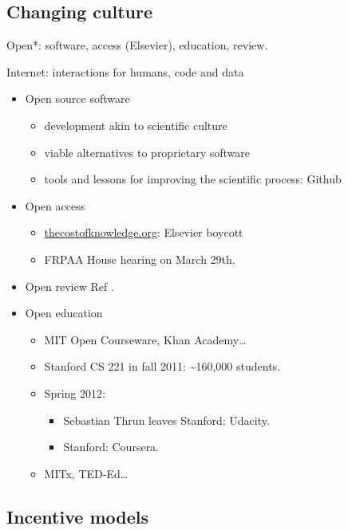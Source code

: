 \documentclass[ChapterTOCs,krantz2]{krantz} %
\begin{document}
\subsection{Changing culture}

Open{*}: software, access (Elsevier), education, review.

Internet: interactions for humans, code and data

\begin{itemize}
\item Open source software

\begin{itemize}
\item development akin to scientific culture
\item viable alternatives to proprietary software
\item tools and lessons for improving the scientific process: Github
\end{itemize}

\item Open access

\begin{itemize}
\item \url{thecostofknowledge.org}: Elsevier boycott
\item FRPAA House hearing on March 29th.
\end{itemize}

\item Open review
Ref \cite{10.3389/fncom.2012.00018}.

\item Open education

\begin{itemize}
\item MIT Open Courseware, Khan Academy\ldots
\item Stanford CS 221 in fall 2011: \textasciitilde{}160,000 students.
\item Spring 2012:

\begin{itemize}
\item Sebastian Thrun leaves Stanford: Udacity.
\item Stanford: Coursera.
\end{itemize}
\item MITx, TED-Ed\ldots
\end{itemize}
\end{itemize}

\subsection{Incentive models}
\end{document}
